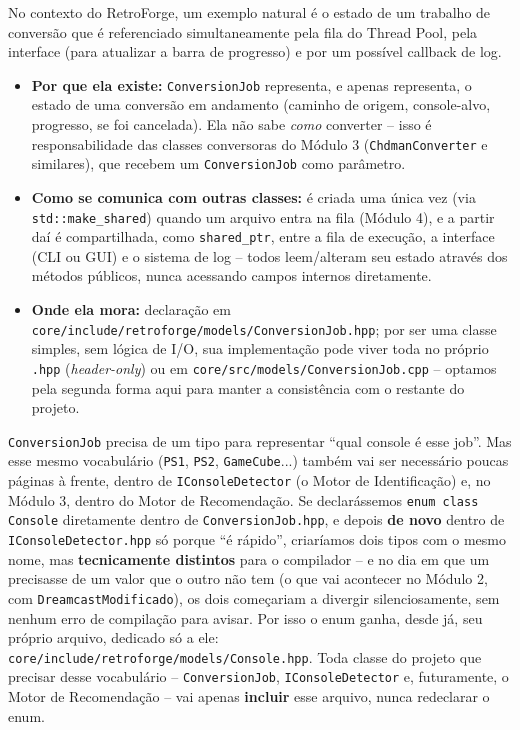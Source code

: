No contexto do RetroForge, um exemplo natural é o estado de um trabalho de conversão que é referenciado simultaneamente pela fila do Thread Pool, pela interface (para atualizar a barra de progresso) e por um possível callback de log.

\begin{itemize}
    \item \textbf{Por que ela existe:} \texttt{ConversionJob} representa, e apenas representa, o estado de uma conversão em andamento (caminho de origem, console-alvo, progresso, se foi cancelada). Ela não sabe \textit{como} converter -- isso é responsabilidade das classes conversoras do Módulo 3 (\texttt{ChdmanConverter} e similares), que recebem um \texttt{ConversionJob} como parâmetro.
    \item \textbf{Como se comunica com outras classes:} é criada uma única vez (via \texttt{std::make\_shared}) quando um arquivo entra na fila (Módulo 4), e a partir daí é compartilhada, como \texttt{shared\_ptr}, entre a fila de execução, a interface (CLI ou GUI) e o sistema de log -- todos leem/alteram seu estado através dos métodos públicos, nunca acessando campos internos diretamente.
    \item \textbf{Onde ela mora:} declaração em \texttt{core/include/retroforge/models/ConversionJob.hpp}; por ser uma classe simples, sem lógica de I/O, sua implementação pode viver toda no próprio \texttt{.hpp} (\textit{header-only}) ou em \texttt{core/src/models/ConversionJob.cpp} -- optamos pela segunda forma aqui para manter a consistência com o restante do projeto.
\end{itemize}

\begin{CaixaInfo}[title={Uma decisão pequena que evita um problema grande: onde mora o \texttt{enum Console}}]
\texttt{ConversionJob} precisa de um tipo para representar ``qual console é esse job''. Mas esse mesmo vocabulário (\texttt{PS1}, \texttt{PS2}, \texttt{GameCube}...) também vai ser necessário poucas páginas à frente, dentro de \texttt{IConsoleDetector} (o Motor de Identificação) e, no Módulo 3, dentro do Motor de Recomendação. Se declarássemos \texttt{enum class Console} diretamente dentro de \texttt{ConversionJob.hpp}, e depois \textbf{de novo} dentro de \texttt{IConsoleDetector.hpp} só porque ``é rápido'', criaríamos dois tipos com o mesmo nome, mas \textbf{tecnicamente distintos} para o compilador -- e no dia em que um precisasse de um valor que o outro não tem (o que vai acontecer no Módulo 2, com \texttt{DreamcastModificado}), os dois começariam a divergir silenciosamente, sem nenhum erro de compilação para avisar. Por isso o enum ganha, desde já, seu próprio arquivo, dedicado só a ele: \texttt{core/include/retroforge/models/Console.hpp}. Toda classe do projeto que precisar desse vocabulário -- \texttt{ConversionJob}, \texttt{IConsoleDetector} e, futuramente, o Motor de Recomendação -- vai apenas \textbf{incluir} esse arquivo, nunca redeclarar o enum.
\end{CaixaInfo}

